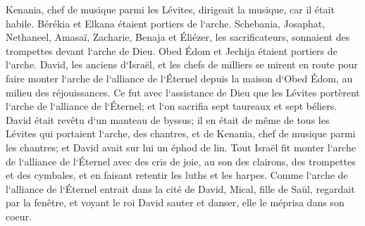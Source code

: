 \verse Kenania, chef de musique parmi les Lévites, dirigeait la musique, car il était habile. 
\verse Bérékia et Elkana étaient portiers de l`arche. 
\verse Schebania, Josaphat, Nethaneel, Amasaï, Zacharie, Benaja et Éliézer, les sacrificateurs, sonnaient des trompettes devant l`arche de Dieu. Obed Édom et Jechija étaient portiers de l`arche. 
\verse David, les anciens d`Israël, et les chefs de milliers se mirent en route pour faire monter l`arche de l`alliance de l`Éternel depuis la maison d`Obed Édom, au milieu des réjouissances. 
\verse Ce fut avec l`assistance de Dieu que les Lévites portèrent l`arche de l`alliance de l`Éternel; et l`on sacrifia sept taureaux et sept béliers. 
\verse David était revêtu d`un manteau de byssus; il en était de même de tous les Lévites qui portaient l`arche, des chantres, et de Kenania, chef de musique parmi les chantres; et David avait sur lui un éphod de lin. 
\verse Tout Israël fit monter l`arche de l`alliance de l`Éternel avec des cris de joie, au son des clairons, des trompettes et des cymbales, et en faisant retentir les luths et les harpes. 
\verse Comme l`arche de l`alliance de l`Éternel entrait dans la cité de David, Mical, fille de Saül, regardait par la fenêtre, et voyant le roi David sauter et danser, elle le méprisa dans son coeur. 

\chapter{}

